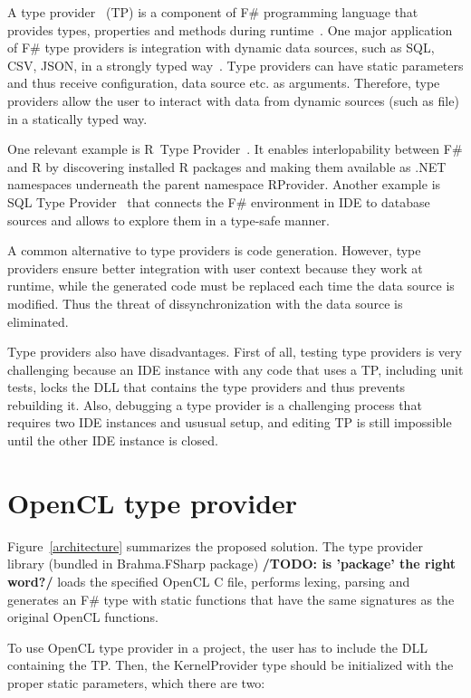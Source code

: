 \documentclass[sigplan,review]{acmart}\settopmatter{printfolios=true}
\begin{document}
A type provider~\cite{syme2012strongly} (TP) is a component of F\# programming language that provides types, properties and methods during runtime~\cite{TypeProviders}. One major application of F\# type providers is integration with dynamic data sources, such as SQL, CSV, JSON, in a strongly typed way~\cite{FSharpData}. Type providers can have static parameters and thus receive configuration, data source etc. as arguments. Therefore, type providers allow the user to interact with data from dynamic sources (such as file) in a statically typed way.

One relevant example is R~Type Provider~\cite{R_TP}. It enables interlopability between F\# and R by discovering installed R packages and making them available as .NET namespaces underneath the parent namespace RProvider. Another example is SQL Type Provider~\cite{SQL_TP} that connects the F\# environment in IDE to database sources and allows to explore them in a type-safe manner.

A common alternative to type providers is code generation. However, type providers ensure better integration with user context because they work at runtime, while the generated code must be replaced each time the data source is modified. Thus the threat of dissynchronization with the data source is eliminated.

Type providers also have disadvantages. First of all, testing type providers is very challenging because an IDE instance with any code that uses a TP, including unit tests, locks the DLL that contains the type providers and thus prevents rebuilding it. Also, debugging a type provider is a challenging process that requires two IDE instances and ususual setup, and editing TP is still impossible until the other IDE instance is closed.

\section{OpenCL type provider}

Figure~\ref{architecture} summarizes the proposed solution. The type provider library (bundled in Brahma.FSharp package) \textbf{/TODO: is 'package' the right word?/} loads the specified OpenCL C file, performs lexing, parsing and generates an F\# type with static functions that have the same signatures as the original OpenCL functions.

To use OpenCL type provider in a project, the user has to include the DLL containing the TP. Then, the KernelProvider type should be initialized with the proper static parameters, which there are two:
\end{document}
